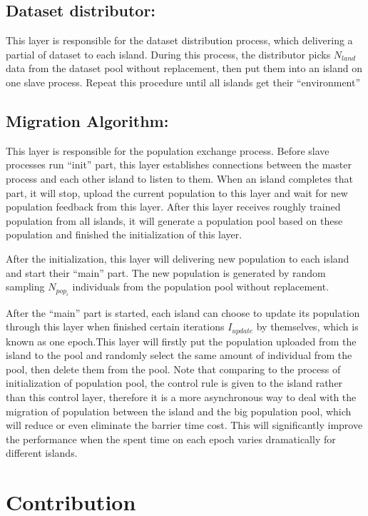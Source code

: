 \documentclass[conference]{IEEEtran}
\begin{document}
	\subsection{Dataset distributor:}
	This layer is responsible for the dataset distribution process, which delivering a partial of dataset to each island. During this process, the distributor picks $N_{land}$ data from the dataset pool without replacement, then put them into an island on one slave process. Repeat this procedure until all islands get their “environment”
	\subsection{Migration Algorithm:}
	This layer is responsible for the population exchange process. Before slave processes run “init” part, this layer establishes connections between the master process and each other island to listen to them. When an island completes that part, it will stop, upload the current population to this layer and wait for new population feedback from this layer. After this layer receives roughly trained population from all islands, it will generate a population pool based on these population and finished the initialization of this layer.
	
	
	After the initialization, this layer will delivering new population to each island and start their “main” part. The new population is generated by random sampling $ N_{pop_i}$ individuals from the population pool without replacement.
	
	
	After the “main” part is started, each island can choose to update its population through this layer when finished certain iterations $I_{update}$ by themselves, which is known as one epoch.This layer will firstly put the population uploaded from the island to the pool and randomly select the same amount of individual from the pool, then delete them from the pool. Note that comparing to the process of initialization of population pool, the control rule is given to the island rather than this control layer, therefore it is a more asynchronous way to deal with the migration of population between the island and the big population pool, which will reduce or even eliminate the barrier time cost. This will significantly improve the performance when the spent time on each epoch varies dramatically for different islands.
	
  \section{Contribution}
  
\end{document}
